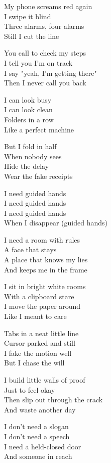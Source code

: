 \begin{lyrics}

My phone screams red again\\
I swipe it blind\\
Three alarms, four alarms\\
Still I cut the line

You call to check my steps\\
I tell you I'm on track\\
I say "yeah, I'm getting there"\\
Then I never call you back

I can look busy\\
I can look clean\\
Folders in a row\\
Like a perfect machine

But I fold in half\\
When nobody sees\\
Hide the delay\\
Wear the fake receipts

I need guided hands\\
I need guided hands\\
I need guided hands\\
When I disappear (guided hands)

I need a room with rules\\
A face that stays\\
A place that knows my lies\\
And keeps me in the frame

I sit in bright white rooms\\
With a clipboard stare\\
I move the paper around\\
Like I meant to care

Tabs in a neat little line\\
Cursor parked and still\\
I fake the motion well\\
But I chase the will

I build little walls of proof\\
Just to feel okay\\
Then slip out through the crack\\
And waste another day

I don't need a slogan\\
I don't need a speech\\
I need a held-closed door\\
And someone in reach


\end{lyrics}
